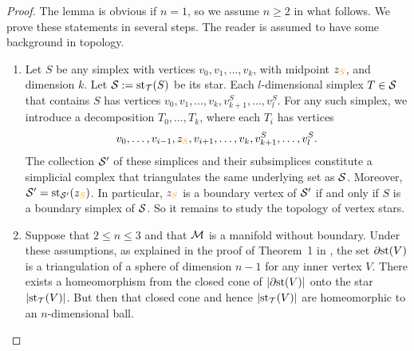 \documentclass[10pt,letterpaper]{article}
\newcommand\cye[1]{%
  \protect\leavevmode
  \begingroup
    \color{red!35!yellow}%
    #1%
  \endgroup
}
\begin{document}
\begin{proof}
    The lemma is obvious if $n = 1$, so we assume $n \geq 2$ in what follows. 
    We prove these statements in several steps. 
    The reader is assumed to have some background in topology. 
    \begin{enumerate}
    \item 
    Let $S$ be any simplex with vertices $v_0, v_1, \dots, v_k$, with midpoint $z_{\cye{S}}$, and dimension $k$.
    Let ${\mathcal S} := \operatorname{st}_{{\mathcal T}}(S)$ be its star. 
    Each $l$-dimensional simplex $T \in {\mathcal S}$ that contains $S$ 
    has vertices $v_0, v_1, \dots, v_k, v_{k+1}^{S}, \dots, v_{l}^{S}$. 
    For any such simplex, we introduce a decomposition $T_{0}, \dots, T_{k}$, where each $T_{i}$ has vertices 
    \begin{align*}
        v_0, \dots, v_{i-1}, z_{\cye{S}}, v_{i+1}, \dots, v_k, v_{k+1}^{S}, \dots, v_{l}^{S}.
    \end{align*}
    The collection ${\mathcal S}'$ of these simplices and their subsimplices constitute a simplicial complex 
    that triangulates the same underlying set as ${\mathcal S}$.
    Moreover, $\calS' = \patch_{\calS'}(z_{\cye{S}})$. 
    In particular, $z_{\cye{S}}$ is a boundary vertex of ${\mathcal S}'$ if and only if $S$ is a boundary simplex of ${\mathcal S}$. 
    So it remains to study the topology of vertex stars. 
    
    \item 
    Suppose that $2 \leq n \leq 3$ and that ${\mathcal M}$ is a manifold without boundary. 
    Under these assumptions, 
    as explained in the proof of Theorem~1 in \cite{Siebenmann1979},
    the set ${\partial \rm st}(V)$ is a triangulation of a sphere of dimension $n-1$ for any inner vertex $V$. 
    There exists a homeomorphism from the closed cone of $\left| {\partial \rm st}(V) \right|$ onto the star $\left| \operatorname{st}_{{\mathcal T}}(V) \right|$.
    But then that closed cone and hence $\left| \operatorname{st}_{{\mathcal T}}(V) \right|$ are homeomorphic to an $n$-dimensional ball. 
    

\end{enumerate}
\end{proof}
\end{document}
